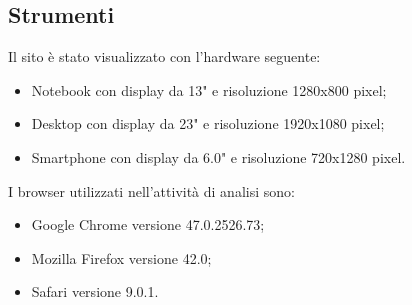 \subsection{Strumenti}
\begin{flushleft}
Il sito è stato visualizzato con l'hardware seguente:
\end{flushleft}
\begin{itemize}
	\item Notebook con display da 13" e risoluzione 1280x800 pixel;
	\item Desktop con display da 23" e risoluzione 1920x1080 pixel;
	\item Smartphone con display da 6.0" e risoluzione 720x1280 pixel.
\end{itemize}
\begin{flushleft}
I browser utilizzati nell'attività di analisi sono:
\end{flushleft}
\begin{itemize}
	\item Google Chrome versione 47.0.2526.73;
	\item Mozilla Firefox versione 42.0;
	\item Safari versione 9.0.1.
\end{itemize}
